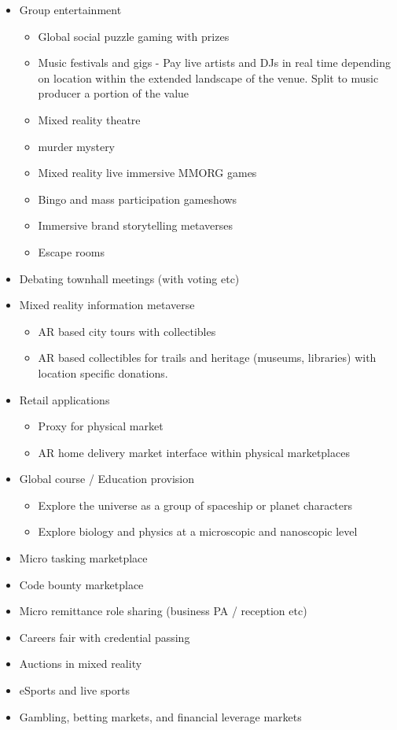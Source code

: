 \documentclass[
	12pt, %
	fleqn, %
	a4paper, %
	oneside, %
]{LegrandOrangeBook}
\begin{document}
\begin{itemize}
\item
  Group entertainment

  \begin{itemize}
  \item Global social puzzle gaming with prizes
  \item
    Music festivals and gigs - Pay live artists and DJs in real time
    depending on location within the extended landscape of the venue.
    Split to music producer a portion of the value
  \item
    Mixed reality theatre
  \item
    murder mystery
  \item
    Mixed reality live immersive MMORG games
  \item
    Bingo and mass participation gameshows
  \item
    Immersive brand storytelling metaverses
  \item
    Escape rooms
  \end{itemize}
\item
  Debating townhall meetings (with voting etc)
\item
  Mixed reality information metaverse

  \begin{itemize}
  \item
    AR based city tours with collectibles
  \item
    AR based collectibles for trails and heritage (museums, libraries)
    with location specific donations.
  \end{itemize}
\item
  Retail applications

  \begin{itemize}
  \item
    Proxy for physical market
  \item
    AR home delivery market interface within physical marketplaces
  \end{itemize}
\item
  Global course / Education provision
    \begin{itemize}
  \item
    Explore the universe as a group of spaceship or planet characters
  \item
    Explore biology and physics at a microscopic and nanoscopic level
  \end{itemize}
\item
  Micro tasking marketplace
\item
  Code bounty marketplace
\item
  Micro remittance role sharing (business PA / reception etc)
\item
  Careers fair with credential passing
\item
  Auctions in mixed reality
\item
  eSports and live sports
\item
  Gambling, betting markets, and financial leverage markets
\end{itemize}
\end{document}
